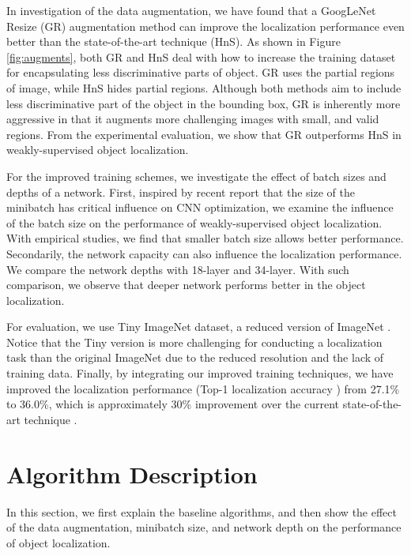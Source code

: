 \documentclass{bmvc2k}
\begin{document}
In investigation of the data augmentation, we have found that a GoogLeNet Resize (GR) augmentation method \cite{szegedy2015going} can improve the localization performance even better than the state-of-the-art technique (HnS). As shown in Figure \ref{fig:augments}, both GR and HnS deal with how to increase the training dataset for encapsulating less discriminative parts of object. GR uses the partial regions of image, while HnS hides partial regions. Although both methods aim to include less discriminative part of the object in the bounding box, GR is inherently more aggressive in that it augments more challenging images with small, and valid regions. From the experimental evaluation, we show that GR outperforms HnS in weakly-supervised object localization. 

For the improved training schemes, we investigate the effect of batch sizes and depths of a network. First, inspired by recent report \cite{li2017visualizing} that the size of the minibatch has critical influence on CNN optimization, we examine the influence of the batch size on the performance of weakly-supervised object localization. With empirical studies, we find that smaller batch size allows better performance. Secondarily, the network capacity can also influence the localization performance. We compare the network depths with 18-layer and 34-layer. With such comparison, we observe that deeper network performs better in the object localization. 

For evaluation, we use Tiny ImageNet dataset, a reduced version of ImageNet \cite{russakovsky2015imagenet}. Notice that the Tiny version is more challenging for conducting a localization task than the original ImageNet due to the reduced resolution and the lack of training data. Finally, by integrating our improved training techniques, we have improved the localization performance (Top-1 localization accuracy \cite{singh2017hide}) from 27.1\% to 36.0\%, which is approximately 30\% improvement over the current state-of-the-art technique \cite{singh2017hide}. 



\section{Algorithm Description}
\label{sec:approaches}

In this section, we first explain the baseline algorithms, and then show the effect of the data augmentation, minibatch size, and network depth on the performance of object localization. 
\end{document}
